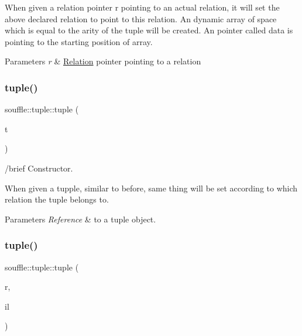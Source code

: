 When given a relation pointer r pointing to an actual relation, it will set the above declared relation to point to this relation. An dynamic array of space which is equal to the arity of the tuple will be created. An pointer called data is pointing to the starting position of array. 
\begin{DoxyParams}{Parameters}
{\em r} & \hyperlink{classsouffle_1_1_relation}{Relation} pointer pointing to a relation \\
\hline
\end{DoxyParams}
\mbox{\label{classsouffle_1_1tuple_ab6821ad47ca64003a4931731a7ceddf2}} 
\subsubsection{\texorpdfstring{tuple()}{tuple()}\hspace{0.1cm}{\footnotesize\ttfamily [2/3]}}
{\footnotesize\ttfamily souffle\+::tuple\+::tuple (\begin{DoxyParamCaption}\item[{const \hyperlink{classsouffle_1_1tuple}{tuple} \&}]{t }\end{DoxyParamCaption})\hspace{0.3cm}{\ttfamily [inline]}}

/brief Constructor.

When given a tupple, similar to before, same thing will be set according to which relation the tuple belongs to. 
\begin{DoxyParams}{Parameters}
{\em Reference} & to a tuple object. \\
\hline
\end{DoxyParams}
\mbox{\label{classsouffle_1_1tuple_af61ac98bf7f0e2171ba91e4d394884df}} 
\subsubsection{\texorpdfstring{tuple()}{tuple()}\hspace{0.1cm}{\footnotesize\ttfamily [3/3]}}
{\footnotesize\ttfamily souffle\+::tuple\+::tuple (\begin{DoxyParamCaption}\item[{\hyperlink{classsouffle_1_1_relation}{Relation} $\ast$}]{r,  }\item[{std\+::initializer\+\_\+list$<$ Ram\+Domain $>$}]{il }\end{DoxyParamCaption})\hspace{0.3cm}{\ttfamily [inline]}}


